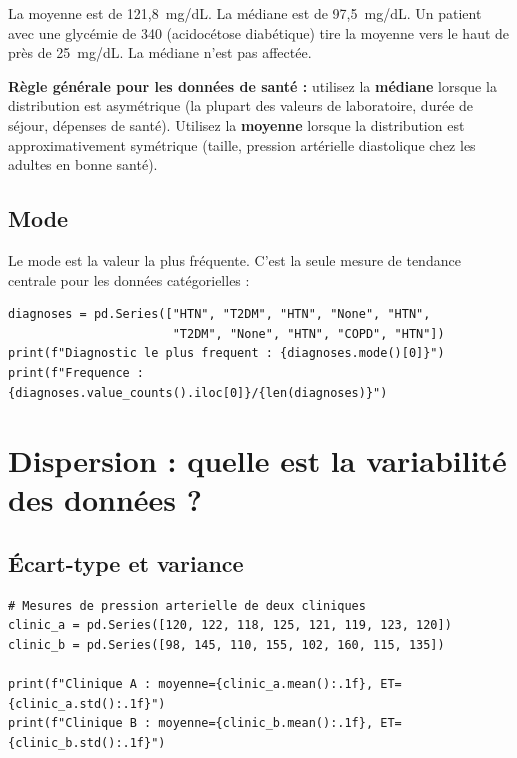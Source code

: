 La moyenne est de 121,8~mg/dL. La m\'ediane est de 97,5~mg/dL. Un patient avec une glyc\'emie de 340 (acidoc\'etose diab\'etique) tire la moyenne vers le haut de pr\`es de 25~mg/dL. La m\'ediane n'est pas affect\'ee.

\begin{clinicalnote}
\textbf{R\`egle g\'en\'erale pour les donn\'ees de sant\'e :} utilisez la \textbf{m\'ediane} lorsque la distribution est asym\'etrique (la plupart des valeurs de laboratoire, dur\'ee de s\'ejour, d\'epenses de sant\'e). Utilisez la \textbf{moyenne} lorsque la distribution est approximativement sym\'etrique (taille, pression art\'erielle diastolique chez les adultes en bonne sant\'e).
\end{clinicalnote}

\subsection{Mode}

Le mode est la valeur la plus fr\'equente. C'est la seule mesure de tendance centrale pour les donn\'ees cat\'egorielles :

\begin{verbatim}
diagnoses = pd.Series(["HTN", "T2DM", "HTN", "None", "HTN",
                       "T2DM", "None", "HTN", "COPD", "HTN"])
print(f"Diagnostic le plus frequent : {diagnoses.mode()[0]}")
print(f"Frequence : {diagnoses.value_counts().iloc[0]}/{len(diagnoses)}")
\end{verbatim}

\section{Dispersion : quelle est la variabilit\'e des donn\'ees ?}

\subsection{\'Ecart-type et variance}

\begin{verbatim}
# Mesures de pression arterielle de deux cliniques
clinic_a = pd.Series([120, 122, 118, 125, 121, 119, 123, 120])
clinic_b = pd.Series([98, 145, 110, 155, 102, 160, 115, 135])

print(f"Clinique A : moyenne={clinic_a.mean():.1f}, ET={clinic_a.std():.1f}")
print(f"Clinique B : moyenne={clinic_b.mean():.1f}, ET={clinic_b.std():.1f}")
\end{verbatim}

